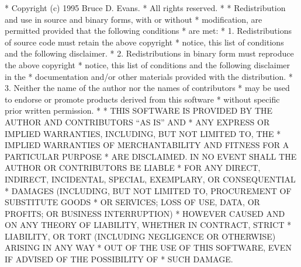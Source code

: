 \begin{copyrightEnv}
 * Copyright (c) 1995 Bruce D. Evans.
 * All rights reserved.
 *
 * Redistribution and use in source and binary forms, with or without
 * modification, are permitted provided that the following conditions
 * are met:
 * 1. Redistributions of source code must retain the above copyright
 *    notice, this list of conditions and the following disclaimer.
 * 2. Redistributions in binary form must reproduce the above copyright
 *    notice, this list of conditions and the following disclaimer in the
 *    documentation and/or other materials provided with the distribution.
 * 3. Neither the name of the author nor the names of contributors
 *    may be used to endorse or promote products derived from this software
 *    without specific prior written permission.
 *
 * THIS SOFTWARE IS PROVIDED BY THE AUTHOR AND CONTRIBUTORS ``AS IS'' AND
 * ANY EXPRESS OR IMPLIED WARRANTIES, INCLUDING, BUT NOT LIMITED TO, THE
 * IMPLIED WARRANTIES OF MERCHANTABILITY AND FITNESS FOR A PARTICULAR PURPOSE
 * ARE DISCLAIMED.  IN NO EVENT SHALL THE AUTHOR OR CONTRIBUTORS BE LIABLE
 * FOR ANY DIRECT, INDIRECT, INCIDENTAL, SPECIAL, EXEMPLARY, OR CONSEQUENTIAL
 * DAMAGES (INCLUDING, BUT NOT LIMITED TO, PROCUREMENT OF SUBSTITUTE GOODS
 * OR SERVICES; LOSS OF USE, DATA, OR PROFITS; OR BUSINESS INTERRUPTION)
 * HOWEVER CAUSED AND ON ANY THEORY OF LIABILITY, WHETHER IN CONTRACT, STRICT
 * LIABILITY, OR TORT (INCLUDING NEGLIGENCE OR OTHERWISE) ARISING IN ANY WAY
 * OUT OF THE USE OF THIS SOFTWARE, EVEN IF ADVISED OF THE POSSIBILITY OF
 * SUCH DAMAGE.
\end{copyrightEnv}

